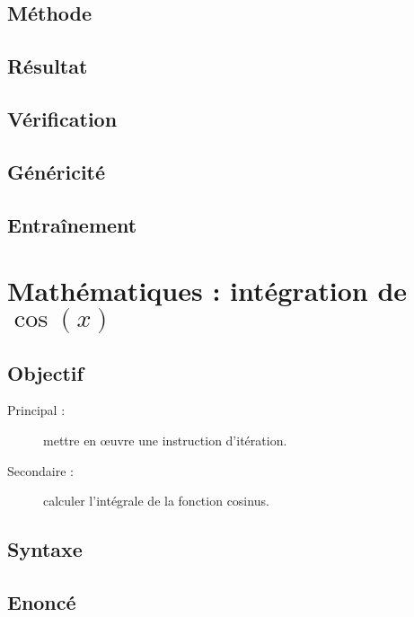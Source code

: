 \subsection{Méthode}\label{boucles:figures:methode}

\subsection{Résultat}\label{boucles:figures:resultat}

\subsection{Vérification}\label{boucles:figures:verification}

\subsection{Généricité}\label{boucles:figures:genericite}

\subsection{Entraînement}\label{boucles:figures:entrainement}

\section{Mathématiques : intégration de $\cos(x)$}\label{boucles:maths}

\subsection{Objectif}\label{boucles:maths:objectif}
\begin{description}
\item[Principal : ] mettre en \oe uvre une instruction d'itération.
\item[Secondaire :] calculer l'intégrale de la fonction cosinus.
\end{description}

\subsection{Syntaxe \python}\label{boucles:maths:python}

\subsection{Enoncé}\label{boucles:maths:enonce}

